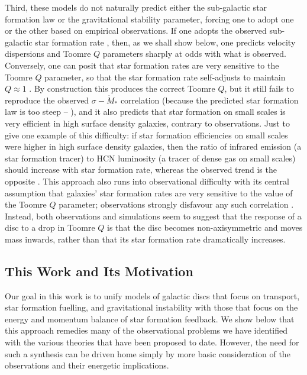 \documentclass[useAMS,usenatbib]{mn2e}
\begin{document}
Third, these models do not naturally predict either the sub-galactic star formation law or the gravitational stability parameter, forcing one to adopt one or the other based on empirical observations. If one adopts the observed sub-galactic star formation rate \citep[e.g.,][]{ostriker11a}, then, as we shall show below, one predicts velocity dispersions and Toomre $Q$ parameters sharply at odds with what is observed. Conversely, one can posit that star formation rates are very sensitive to the Toomre $Q$ parameter, so that the star formation rate self-adjusts to maintain $Q\approx 1$ \citep[e.g.,][]{faucher-giguere13a, hayward17a}. By construction this produces the correct Toomre $Q$, but it still fails to reproduce the observed $\sigma-\dot{M}_*$ correlation (because the predicted star formation law is too steep -- \citealt{krumholz16a}), and it also predicts that star formation on small scales is very efficient in high surface density galaxies, contrary to observations. Just to give one example of this difficulty: if star formation efficiencies on small scales were higher in high surface density galaxies, then the ratio of infrared emission (a star formation tracer) to HCN luminosity (a tracer of dense gas on small scales) should increase with star formation rate, whereas the observed trend is the opposite \citep{garcia-burillo12a, usero15a}. This approach also runs into observational difficulty with its central assumption that galaxies' star formation rates are very sensitive to the value of the Toomre $Q$ parameter; observations strongly disfavour any such correlation \citep{leroy08a}. Instead, both observations and simulations \citep{agertz09a, goldbaum15a, goldbaum16a} seem to suggest that the response of a disc to a drop in Toomre $Q$ is that the disc becomes non-axisymmetric and moves mass inwards, rather than that its star formation rate dramatically increases.

\subsection{This Work and Its Motivation}

Our goal in this work is to unify models of galactic discs that focus on transport, star formation fuelling, and gravitational instability with those that focus on the energy and momentum balance of star formation feedback. We show below that this approach remedies many of the observational problems we have identified with the various theories that have been proposed to date. However, the need for such a synthesis can be driven home simply by more basic consideration of the observations and their energetic implications.
\end{document}
